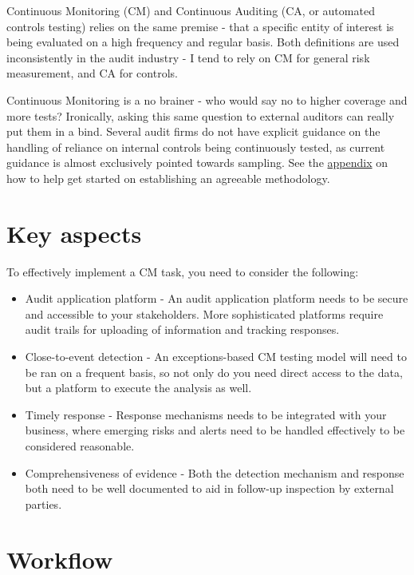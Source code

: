 \documentclass[
]{book}
\providecommand{\tightlist}{%
  \setlength{\itemsep}{0pt}\setlength{\parskip}{0pt}}
\begin{document}
Continuous Monitoring (CM) and Continuous Auditing (CA, or automated controls testing) relies on the same premise - that a specific entity of interest is being evaluated on a high frequency and regular basis. Both definitions are used inconsistently in the audit industry - I tend to rely on CM for general risk measurement, and CA for controls.

Continuous Monitoring is a no brainer - who would say no to higher coverage and more tests? Ironically, asking this same question to external auditors can really put them in a bind. Several audit firms do not have explicit guidance on the handling of reliance on internal controls being continuously tested, as current guidance is almost exclusively pointed towards sampling. See the \protect\hyperlink{appendixct}{appendix} on how to help get started on establishing an agreeable methodology.

\hypertarget{key-aspects}{%
\section{Key aspects}\label{key-aspects}}

To effectively implement a CM task, you need to consider the following:

\begin{itemize}
\tightlist
\item
  Audit application platform - An audit application platform needs to be secure and accessible to your stakeholders. More sophisticated platforms require audit trails for uploading of information and tracking responses.
\item
  Close-to-event detection - An exceptions-based CM testing model will need to be ran on a frequent basis, so not only do you need direct access to the data, but a platform to execute the analysis as well.
\item
  Timely response - Response mechanisms needs to be integrated with your business, where emerging risks and alerts need to be handled effectively to be considered reasonable.
\item
  Comprehensiveness of evidence - Both the detection mechanism and response both need to be well documented to aid in follow-up inspection by external parties.
\end{itemize}

\hypertarget{workflow}{%
\section{Workflow}\label{workflow}}
\end{document}
